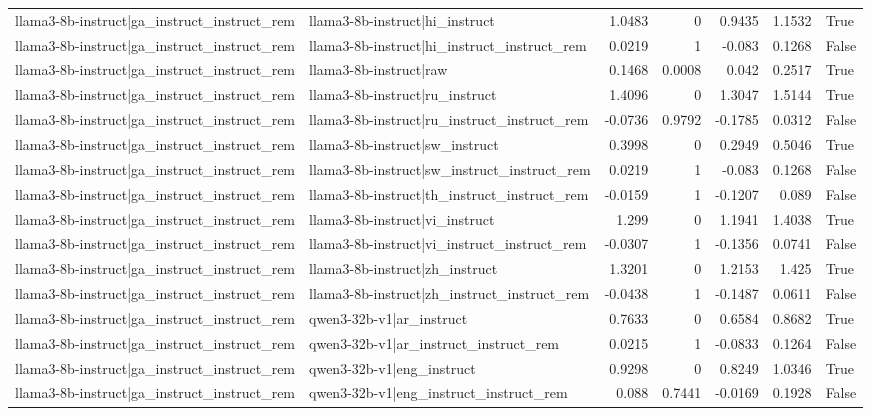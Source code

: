 \begin{table}
\begin{tabular}{l l r r r r l}
llama3-8b-instruct|ga_instruct_instruct_rem & llama3-8b-instruct|hi_instruct & 1.0483 & 0 & 0.9435 & 1.1532 & True \\
llama3-8b-instruct|ga_instruct_instruct_rem & llama3-8b-instruct|hi_instruct_instruct_rem & 0.0219 & 1 & -0.083 & 0.1268 & False \\
llama3-8b-instruct|ga_instruct_instruct_rem & llama3-8b-instruct|raw & 0.1468 & 0.0008 & 0.042 & 0.2517 & True \\
llama3-8b-instruct|ga_instruct_instruct_rem & llama3-8b-instruct|ru_instruct & 1.4096 & 0 & 1.3047 & 1.5144 & True \\
llama3-8b-instruct|ga_instruct_instruct_rem & llama3-8b-instruct|ru_instruct_instruct_rem & -0.0736 & 0.9792 & -0.1785 & 0.0312 & False \\
llama3-8b-instruct|ga_instruct_instruct_rem & llama3-8b-instruct|sw_instruct & 0.3998 & 0 & 0.2949 & 0.5046 & True \\
llama3-8b-instruct|ga_instruct_instruct_rem & llama3-8b-instruct|sw_instruct_instruct_rem & 0.0219 & 1 & -0.083 & 0.1268 & False \\
llama3-8b-instruct|ga_instruct_instruct_rem & llama3-8b-instruct|th_instruct_instruct_rem & -0.0159 & 1 & -0.1207 & 0.089 & False \\
llama3-8b-instruct|ga_instruct_instruct_rem & llama3-8b-instruct|vi_instruct & 1.299 & 0 & 1.1941 & 1.4038 & True \\
llama3-8b-instruct|ga_instruct_instruct_rem & llama3-8b-instruct|vi_instruct_instruct_rem & -0.0307 & 1 & -0.1356 & 0.0741 & False \\
llama3-8b-instruct|ga_instruct_instruct_rem & llama3-8b-instruct|zh_instruct & 1.3201 & 0 & 1.2153 & 1.425 & True \\
llama3-8b-instruct|ga_instruct_instruct_rem & llama3-8b-instruct|zh_instruct_instruct_rem & -0.0438 & 1 & -0.1487 & 0.0611 & False \\
llama3-8b-instruct|ga_instruct_instruct_rem & qwen3-32b-v1|ar_instruct & 0.7633 & 0 & 0.6584 & 0.8682 & True \\
llama3-8b-instruct|ga_instruct_instruct_rem & qwen3-32b-v1|ar_instruct_instruct_rem & 0.0215 & 1 & -0.0833 & 0.1264 & False \\
llama3-8b-instruct|ga_instruct_instruct_rem & qwen3-32b-v1|eng_instruct & 0.9298 & 0 & 0.8249 & 1.0346 & True \\
llama3-8b-instruct|ga_instruct_instruct_rem & qwen3-32b-v1|eng_instruct_instruct_rem & 0.088 & 0.7441 & -0.0169 & 0.1928 & False \\

\end{tabular}
\end{table}
